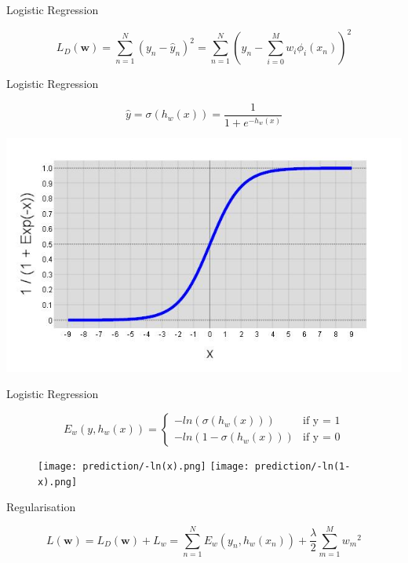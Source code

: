 \begin{frame}{Logistic Regression}

\[ L_D(\textbf{w}) = \sum_{n=1}^N (y_n-\hat{y}_n)^2 = \sum_{n=1}^N \left(y_n - \sum_{i=0}^M w_i \phi_i(x_n)\right)^{2} \] 

\end{frame}

\begin{frame}{Logistic Regression}

\[ \hat{y} = \sigma(h_w(x)) = \frac{1}{1+e^{-h_w(x)}} \]

\includegraphics[scale=0.5]{prediction/sigmoid}

\end{frame}	


\begin{frame}{Logistic Regression}


\[E_w(y,h_w(x)) = \begin{cases}
	-ln(\sigma(h_w(x))) &\text{if y = 1}\\	
	-ln(1-\sigma(h_w(x))) &\text{if y = 0}
\end{cases}\]
%

\begin{figure}
   \texttt{[image: prediction/-ln(x).png]}
   \hfill
   \texttt{[image: prediction/-ln(1-x).png]}
\end{figure}

\end{frame}

\begin{frame}{Regularisation}

\[ L(\mathbf{w})
  = L_D(\mathbf{w}) + L_w 
  = \sum_{n=1}^N E_w(y_n, h_w(x_n)) + \frac{\lambda}{2} \sum_{m=1}^{M} {w_m}^2 \] 

\end{frame}

